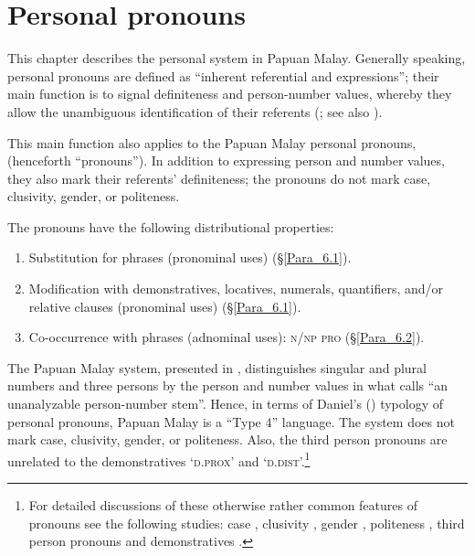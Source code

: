 \chapter[Personal pronouns]{Personal pronouns}
\label{Para_6}
This chapter describes the personal  system in Papuan Malay. Generally speaking, personal pronouns are defined as “inherent referential and  expressions”; their main function is to signal definiteness and person-number values, whereby they allow the unambiguous identification of their referents (\citealt[26]{Helmbrecht.2004}; see also \citealt{Abbot.2006}).



This main function also applies to the Papuan Malay personal pronouns, (henceforth ``pronouns''). In addition to expressing person and number values, they also mark their referents’ definiteness; the pronouns do not mark case, clusivity, gender, or politeness.



The pronouns have the following distributional properties:



\begin{enumerate}
\item 
Substitution for  phrases (pronominal uses) (§\ref{Para_6.1}).

\item 
Modification with demonstratives, locatives, numerals, quantifiers, and/or relative clauses (pronominal uses) (§\ref{Para_6.1}).

\item 
Co-occurrence with  phrases (adnominal uses): \textsc{n/np} \textsc{pro} (§\ref{Para_6.2})\textsc{.}

\end{enumerate}

The Papuan Malay  system, presented in , distinguishes singular and plural numbers and three persons by the person and number values in what \citet[3]{Daniel.2013b} calls “an unanalyzable person-number stem”. Hence, in terms of Daniel’s (\citeyear*[3]{Daniel.2013b}) typology of personal pronouns, Papuan Malay is a ``Type 4'' language.
The  system does not mark case, clusivity, gender, or politeness. Also, the third person pronouns are unrelated to the demonstratives  ‘\textsc{d.prox}’ and  ‘\textsc{d.dist}’.\footnote{For detailed discussions of these otherwise rather common features of pronouns see the following studies: case \citep{Bhat.2007}, clusivity \citep{Filimonova.2005}, gender \citep{Siewierska.2013}, politeness \citep{Helmbrecht.2013}, third person pronouns and demonstratives \citep{Bhat.2013}.}



